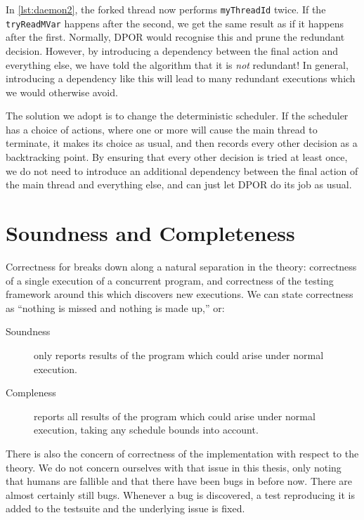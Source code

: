 In \cref{lst:daemon2}, the forked thread now performs
\verb|myThreadId| twice.  If the \verb|tryReadMVar| happens after the
second, we get the same result as if it happens after the first.
Normally, DPOR would recognise this and prune the redundant decision.
However, by introducing a dependency between the final action and
everything else, we have told the algorithm that it is \emph{not}
redundant!  In general, introducing a dependency like this will lead
to many redundant executions which we would otherwise avoid.

The solution we adopt is to change the deterministic scheduler.  If
the scheduler has a choice of actions, where one or more will cause
the main thread to terminate, it makes its choice as usual, and then
records every other decision as a backtracking point.  By ensuring
that every other decision is tried at least once, we do not need to
introduce an additional dependency between the final action of the
main thread and everything else, and can just let DPOR do its job as
usual.

\section{Soundness and Completeness}
\label{sec:dejafu-correctness}

Correctness for \dejafu{} breaks down along a natural separation in
the theory: correctness of a single execution of a concurrent program,
and correctness of the testing framework around this which discovers
new executions.  We can state correctness as ``nothing is missed and
nothing is made up,'' or:

\begin{description}
\item[Soundness] \dejafu{} only reports results of the program which
  could arise under normal execution.
\item[Compleness] \dejafu{} reports all results of the program which
  could arise under normal execution, taking any schedule bounds into
  account.
\end{description}

There is also the concern of correctness of the implementation with
respect to the theory.  We do not concern ourselves with that issue in
this thesis, only noting that humans are fallible and that there have
been bugs in \dejafu{} before now.  There are almost certainly still
bugs.  Whenever a bug is discovered, a test reproducing it is added to
the testsuite and the underlying issue is fixed.

